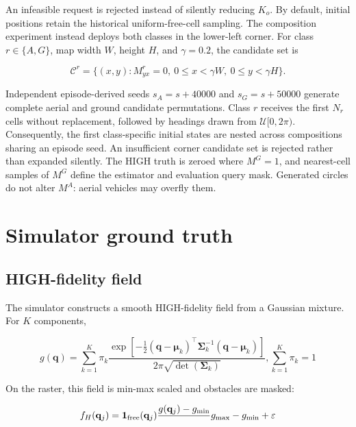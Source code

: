 \documentclass[11pt]{article}
\begin{document}
An infeasible request is rejected instead of silently reducing $K_o$. By
default, initial positions retain the historical uniform-free-cell sampling.
The composition experiment instead deploys both classes in the lower-left
corner. For class $r\in\{A,G\}$, map width $W$, height $H$, and $\gamma=0.2$,
the candidate set is


\begin{equation}
\mathcal C^r
=
\{(x,y):M^r_{yx}=0,\ 0\le x<\gamma W,\ 0\le y<\gamma H\}.
\end{equation}


Independent episode-derived seeds $s_A=s+40000$ and $s_G=s+50000$ generate
complete aerial and ground candidate permutations. Class $r$ receives the
first $N_r$ cells without replacement, followed by headings drawn from
$\mathcal U[0,2\pi)$. Consequently, the first class-specific initial states
are nested across compositions sharing an episode seed. An insufficient
corner candidate set is rejected rather than expanded silently. The HIGH truth
is zeroed where $M^G=1$, and nearest-cell samples of $M^G$ define the estimator
and evaluation query mask. Generated circles do not alter $M^A$: aerial
vehicles may overfly them.


\section{Simulator ground truth}


\subsection{HIGH-fidelity field}


The simulator constructs a smooth HIGH-fidelity field from a Gaussian mixture. For $K$ components,


\begin{equation}
g(\mathbf q) = \sum_{k=1}^{K}
\pi_k
\frac{
\exp\!\left[
-\frac{1}{2}
(\mathbf q-\boldsymbol\mu_k)^\top
\boldsymbol\Sigma_k^{-1}
(\mathbf q-\boldsymbol\mu_k)
\right]
}{
2\pi\sqrt{\det(\boldsymbol\Sigma_k)}
},
\sum_{k=1}^{K}\pi_k=1
\end{equation}


On the raster, this field is min-max scaled and obstacles are masked:


\begin{equation}
f_H(\mathbf q_j) \\
= \\
\mathbf 1_{\mathrm{free}}(\mathbf q_j) \\
\frac{g(\mathbf q_j)-g_{\min}} \\
{g_{\max}-g_{\min}+\varepsilon}
\end{equation}
\end{document}
